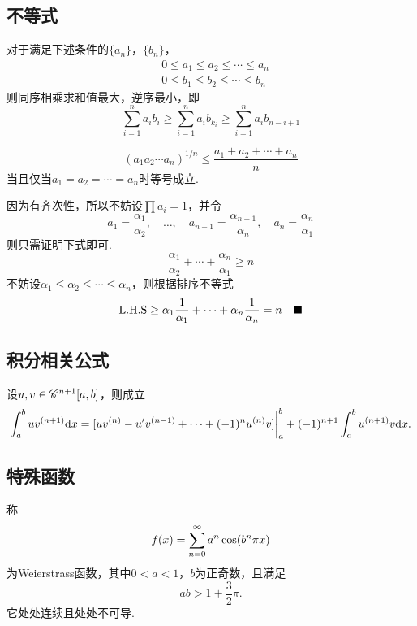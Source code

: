\subsection{不等式}

  \begin{lemma}[排序不等式]
    \label{lemma: 排序不等式}
    对于满足下述条件的$\{a_n\}$，$\{b_n\}$，
    \[\begin{split}
      & 0 \le a_1\le a_2\le\cdots\le a_n \\
      & 0 \le b_1\le b_2\le\cdots\le b_n
    \end{split}\]
    则同序相乘求和值最大，逆序最小，即
    \[
      \sum_{i=1}^n a_ib_i \ge \sum_{i=1}^n a_ib_{k_i}
      \ge \sum_{i=1}^n a_ib_{n-i+1}
    \]
  \end{lemma}

  \begin{lemma}[算数-几何均值不等式]
    \[
      (a_1a_2\cdots a_n)^{1/n} \le \frac{a_1+a_2+\cdots+a_n}{n}
    \]
    当且仅当$a_1 = a_2 = \cdots = a_n$时等号成立.
  \end{lemma}
  \proof
    因为有齐次性，所以不妨设$\prod a_i=1$，并令
    \[
      a_1=\frac{\alpha_1}{\alpha_2},\quad
      \dots,\quad
      a_{n-1} = \frac{\alpha_{n-1}}{\alpha_n},\quad
      a_n = \frac{\alpha_n}{\alpha_1}
    \]
    则只需证明下式即可.
    \[
      \frac{\alpha_1}{\alpha_2} + \cdots + \frac{\alpha_n}{\alpha_1}
      \ge n
    \]
    不妨设$\alpha_1 \le \alpha_2 \le \cdots \le \alpha_n$，则根据排序不等式
    \[
      \text{L.H.S} \ge \alpha_1\frac{1}{\alpha_1} + \cdots + \alpha_n\frac{1}{\alpha_n}
       = n \quad\blacksquare
    \]

\newpage
\subsection{积分相关公式}
  \begin{lemma}[分部积分]
    设$u,v\in\mathscr{C}^{n+1}[a, b]$，则成立
    \[
      \int_a^buv^{(n+1)}\mathrm{d} x =
      [ uv^{(n)} - u^\prime v^{(n-1)} + \cdots +  (-1)^nu^{(n)}v]
      \bigg\vert_a^b + (-1)^{n+1}\int_a^bu^{(n+1)}v\mathrm{d} x.
    \]
  \end{lemma}

\newpage
\subsection{特殊函数}
  \begin{defi}[处处连续且不可导]
    称
    \[
      \mathnormal{f}(x) = \sum_{n=0}^\infty a^n\cos(b^n\pi x)
    \]
    为Weierstrass函数，其中$0<a<1$，$b$为正奇数，且满足
    \[
      ab > 1 + \frac{3}{2}\pi.
    \]
    它处处连续且处处不可导.
  \end{defi}

\newpage



